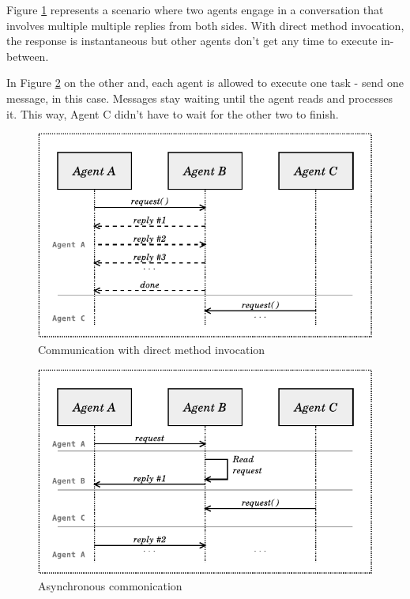 \documentclass[a4paper,twoside]{article}
\begin{document}
Figure \ref{fig:direct_method_execution} represents a scenario where two agents engage in a conversation that involves multiple multiple replies from both sides. With direct method invocation, the response is instantaneous but other agents don't get any time to execute in-between.

In Figure \ref{fig:assynch_execution} on the other and, each agent is allowed to execute one task - send one message, in this case. Messages stay waiting until the agent reads and processes it. This way, Agent C didn't have to wait  for the other two to finish.

\begin{figure}
	\centering
	\includegraphics[width=\linewidth]{../figures/executionProblem.pdf}
	\caption{
		Communication with direct method invocation
	}
	\label{fig:direct_method_execution}
\end{figure}
\begin{figure}
	\centering
	\includegraphics[width=\linewidth]{../figures/executionProblem2.pdf}
	\caption{
		Asynchronous commonication
	}
	\label{fig:assynch_execution}
\end{figure}
\end{document}
